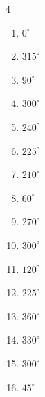 \begin{multicols}{4}
\begin{enumerate}
  \item $\displaystyle 0^{\circ}$
        \phantom{$\displaystyle =0$}

  \item $\displaystyle 315^{\circ}$

  \item $\displaystyle 90^{\circ}$

  \item $\displaystyle 300^{\circ}$

  \item $\displaystyle 240^{\circ}$

  \item $\displaystyle 225^{\circ}$

  \item $\displaystyle 210^{\circ}$

  \item $\displaystyle 60^{\circ}$

  \item $\displaystyle 270^{\circ}$

  \item $\displaystyle 300^{\circ}$

  \item $\displaystyle 120^{\circ}$

  \item $\displaystyle 225^{\circ}$

  \item $\displaystyle 360^{\circ}$
        \phantom{$\displaystyle =2\pi$}

  \item $\displaystyle 330^{\circ}$

  \item $\displaystyle 300^{\circ}$

  \item $\displaystyle 45^{\circ}$


\end{enumerate}
\end{multicols}
